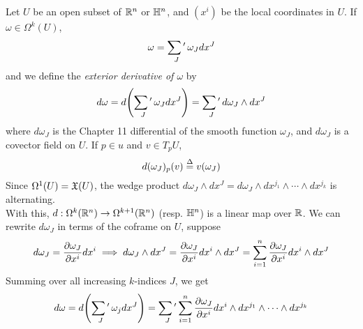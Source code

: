 \documentclass[../main-manifolds.tex]{subfiles}
\begin{document}
\begin{definition}
    Let $U$ be an open subset of ${\mathbb{R}^n}$ or ${\mathbb{H}^n}$, and $(x^i)$ be the local coordinates in $U$. If $\omega\in\Omega^k(U)$, 
    \[
        \omega = \mathop{\sum\nolimits{'}}_J\omega_Jdx^J
    \]
    and we define the \emph{exterior derivative of $\omega$} by
    \[
        d\omega = d\qty(\mathop{\sum\nolimits{'}}_J\omega_J dx^J) = \mathop{\sum\nolimits{'}}_J d\omega_J\wedge dx^J
    \]
    where $d\omega_J$ is the Chapter 11 differential of the smooth function $\omega_J$, and $d\omega_J$ is a covector field on $U$. If $p\in u$ and $v\in T_p U$, 
    \[
        d(\omega_J)_p(v) \overset{\Delta}{=} v(\omega_J)
    \]
    Since $\Omega^1(U) = \mathfrak{X}(U)$, the wedge product $d\omega_J\wedge dx^J = d\omega_J\wedge dx^{j_1}\wedge\cdots\wedge dx^{j_k}$ is alternating. \\

    With this, $d: \Omega^{k}({\mathbb{R}^n})\to \Omega^{k+1}({\mathbb{R}^n})$ (resp. ${\mathbb{H}^n}$) is a linear map over $\mathbb{R}$. We can rewrite $d\omega_J$ in terms of the coframe on $U$, suppose
    \[
        d\omega_J = \pdv{\omega_J}{x^i}dx^i\implies d\omega_J\wedge dx^J = \pdv{\omega_J}{x^i}dx^i\wedge dx^J = \sum_{i=1}^n\pdv{\omega_J}{x^i}dx^i\wedge dx^J
    \]
    Summing over all increasing $k$-indices $J$, we get
    \[
        d\omega = d\qty(\mathop{\sum\nolimits{'}}_J \omega_j dx^J) = \mathop{\sum\nolimits{'}}_J\sum_{i=1}^n\pdv{\omega_J}{x^i}dx^i\wedge dx^{j_1}\wedge\cdots\wedge dx^{j_k}
    \]
\end{definition}
\end{document}
